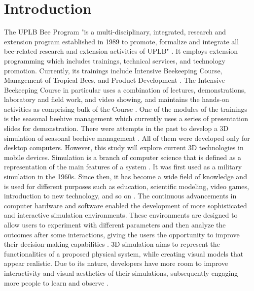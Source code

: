 \documentclass[journal]{./IEEE/IEEEtran}
\begin{document}
\section{Introduction}
\indent The UPLB Bee Program "is a multi-disciplinary, integrated, research and extension program established in 1989 to promote, formalize and integrate all bee-related research and extension activities of UPLB" \cite{uplbbeeprogram}. It employs extension programming which includes trainings, technical services, and technology promotion. Currently, its trainings include Intensive Beekeeping Course, Management of Tropical Bees, and Product Development \cite{uplbbeeprogramsite}. The Intensive Beekeeping Course in particular uses a combination of lectures, demonstrations, laboratory and field work, and video showing, and maintains the hands-on activities as comprising bulk of the Course \cite{beekeepingtraining}.
\newline
\indent One of the modules of the trainings is the seasonal beehive management which currently uses a series of presentation slides for demonstration. There were attempts in the past to develop a 3D simulation of seasonal beehive management \cite{serrano}\cite{clarino}. All of them were developed only for desktop computers. However, this study will explore current 3D technologies in mobile devices.
\newline
\indent Simulation is a branch of computer science that is defined as a representation of the main features of a system \cite{naziretal}. It was first used as a military simulation in the 1960s. Since then, it has become a wide field of knowledge and is used for different purposes such as education, scientific modeling, video games, introduction to new technology, and so on \cite{naziretal}. The continuous advancements in computer hardware and software enabled the development of more sophisticated and interactive simulation environments. These environments are designed to allow users to experiment with different parameters and then analyze the outcomes after some interactions, giving the users the opportunity to improve their decision-making capabilities \cite{barbosa}. 
\newline
\indent 3D simulation aims to represent the functionalities of a proposed physical system, while creating visual models that appear realistic. Due to its nature, developers have more room to improve interactivity and visual aesthetics of their simulations, subsequently engaging more people to learn and observe \cite{santosaetal}.
\newline
\end{document}
